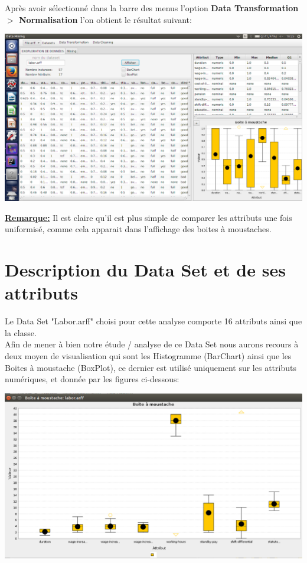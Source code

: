 \documentclass[12pt,a4paper,oneside]{book}
\begin{document}
	Après avoir sélectionné dans la barre des menus l'option \textbf{Data Transformation $>$ Normalisation} l'on obtient le résultat suivant:
	
	\begin{center}
		\includegraphics[width=1\textwidth]{screens/apresNormal.png}%
		\label{labelname}%
	\end{center}
	
	\underline{\textbf{Remarque:}}
	Il est claire qu'il est plus simple de comparer les attributs une fois uniformisé, comme cela apparait dans l'affichage des boites à moustaches.
	
	
	
	
	
	
	\section{Description du Data Set et de ses attributs}
	Le Data Set "Labor.arff" choisi pour cette analyse comporte 16 attributs ainsi que la classe.\\
	Afin de mener à bien notre étude / analyse de ce Data Set nous aurons recours à deux moyen de visualisation qui sont les Histogramme (BarChart) ainsi que les Boites à moustache (BoxPlot), ce dernier est utilisé uniquement sur les attributs numériques, et donnée par les figures ci-dessous:
	\begin{center}
		\includegraphics[width=1\textwidth]{screens/BoxPlot.png}%
		\label{labelname}%
	\end{center}
	
\end{document}
